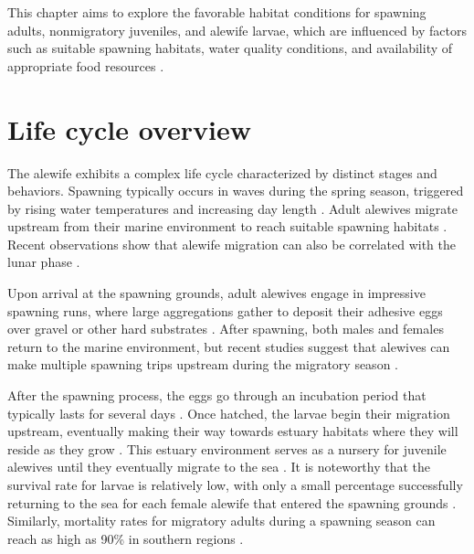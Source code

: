\documentclass[
]{book}
\begin{document}
This chapter aims to explore the favorable habitat conditions for spawning adults, nonmigratory juveniles, and alewife larvae, which are influenced by factors such as suitable spawning habitats, water quality conditions, and availability of appropriate food resources \citep{lynch_projected_2015}.

\hypertarget{life-cycle-overview}{%
\section{Life cycle overview}\label{life-cycle-overview}}

The alewife exhibits a complex life cycle characterized by distinct stages and behaviors. Spawning typically occurs in waves during the spring season, triggered by rising water temperatures and increasing day length \citep{asmfc_amendment_2009, able_alewife_2020}. Adult alewives migrate upstream from their marine environment to reach suitable spawning habitats \citep{bigelow_fishes_1953, bigelow_bigelow_2002}. Recent observations show that alewife migration can also be correlated with the lunar phase \citep{legett_daily_2021}.

Upon arrival at the spawning grounds, adult alewives engage in impressive spawning runs, where large aggregations gather to deposit their adhesive eggs over gravel or other hard substrates \citep{pardue_habitat_1983, janssen_preference_2004}. After spawning, both males and females return to the marine environment, but recent studies suggest that alewives can make multiple spawning trips upstream during the migratory season \citep{bigelow_fishes_1953, bigelow_bigelow_2002, mccartin_new_2019}.

After the spawning process, the eggs go through an incubation period that typically lasts for several days \citep{bigelow_fishes_1953, bigelow_bigelow_2002}. Once hatched, the larvae begin their migration upstream, eventually making their way towards estuary habitats where they will reside as they grow \citep{pardue_habitat_1983}. This estuary environment serves as a nursery for juvenile alewives until they eventually migrate to the sea \citep{kosa_processes_2001, laney_relationship_1997}. It is noteworthy that the survival rate for larvae is relatively low, with only a small percentage successfully returning to the sea for each female alewife that entered the spawning grounds \citep{kissil_spawning_1974}. Similarly, mortality rates for migratory adults during a spawning season can reach as high as 90\% in southern regions \citep{brady_part_2005}.
\end{document}

